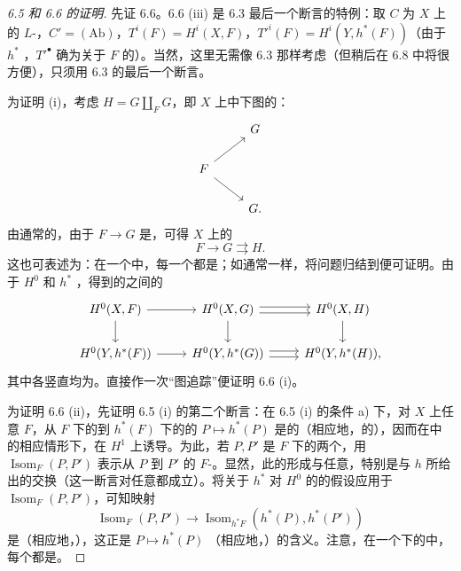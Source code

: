 \begin{proof}[6.5 和 6.6 的证明]
先证 6.6。6.6 (iii) 是 6.3 最后一个断言的特例：取 $C$ 为 $X$ 上的 $L$-，$C'=(\mathrm{Ab})$，$T^i(F)=H^i(X,F)$，$T'^i(F)=H^i(Y,h^*(F))$（由于 $h^*$ ，$T'^\bullet$ 确为关于 $F$ 的）。当然，这里无需像 6.3 那样考虑（但稍后在 6.8 中将很方便），只须用 6.3 的最后一个断言。

为证明 (i)，考虑 $H=G\amalg_FG$，即 $X$ 上中下图的：
\[
\begin{tikzcd}
&G\\
F\arrow[ur]\arrow[dr]&\\
&G.
\end{tikzcd}
\]
由通常的，由于 $F\to G$ 是，可得 $X$ 上的
\[
F\longrightarrow G\rightrightarrows H.
\]
这也可表述为：在一个中，每一个都是；如通常一样，将问题归结到便可证明。由于 $H^0$ 和 $h^*$ ，得到的之间的
\[
\begin{tikzcd}
H^0(X,F)\arrow[r]\arrow[d]&H^0(X,G)\arrow[r,shift left]\arrow[r,shift right]\arrow[d]&H^0(X,H)\arrow[d]\\
H^0(Y,h^*(F))\arrow[r]&H^0(Y,h^*(G))\arrow[r,shift left]\arrow[r,shift right]&H^0(Y,h^*(H)),
\end{tikzcd}
\]
其中各竖直均为。直接作一次“图追踪”便证明 6.6 (i)。

为证明 6.6 (ii)，先证明 6.5 (i) 的第二个断言：在 6.5 (i) 的条件 a) 下，对 $X$ 上任意 $F$，从 $F$ 下的到 $h^*(F)$ 下的的 $P\mapsto h^*(P)$ 是的（相应地，的），因而在中的相应情形下，在 $H^1$ 上诱导。为此，若 $P,P'$ 是 $F$ 下的两个，用 $\operatorname{Isom}_F(P,P')$ 表示从 $P$ 到 $P'$ 的 $F$-。显然，此的形成与任意，特别是与 $h$ 所给出的交换（这一断言对任意都成立）。将关于 $h^*$ 对 $H^0$ 的的假设应用于 $\operatorname{Isom}_F(P,P')$，可知映射
\[
\operatorname{Isom}_F(P,P')\longrightarrow
\operatorname{Isom}_{h^*F}(h^*(P),h^*(P'))
\]
是（相应地，），这正是 $P\mapsto h^*(P)$ （相应地，）的含义。注意，在一个下的中，每个都是。


\end{proof}
